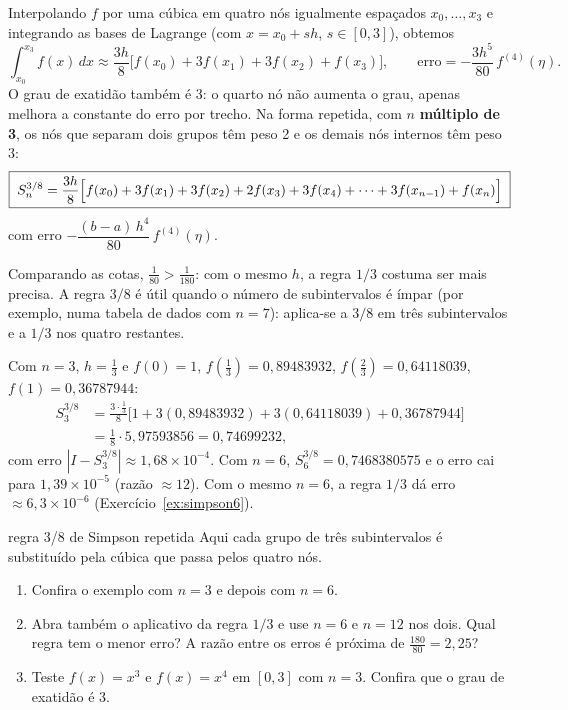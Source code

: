 Interpolando $f$ por uma cúbica em quatro nós igualmente espaçados $x_0,\dots,x_3$ e
integrando as bases de Lagrange (com $x=x_0+sh$, $s\in[0,3]$), obtemos
\[
\int_{x_0}^{x_3}f(x)\,dx\approx\frac{3h}{8}\bigl[f(x_0)+3f(x_1)+3f(x_2)+f(x_3)\bigr],
\qquad\text{erro}=-\frac{3h^5}{80}\,f^{(4)}(\eta).
\]
O grau de exatidão também é 3: o quarto nó não aumenta o grau, apenas melhora a constante
do erro por trecho. Na forma repetida, com $n$ \textbf{múltiplo de 3}, os nós que separam dois
grupos têm peso 2 e os demais nós internos têm peso 3:
\[
\boxed{\;S^{3/8}_n=\frac{3h}{8}\Bigl[f(x_0)+3f(x_1)+3f(x_2)+2f(x_3)+3f(x_4)+\dots+3f(x_{n-1})+f(x_n)\Bigr]\;}
\]
com erro $-\dfrac{(b-a)\,h^4}{80}\,f^{(4)}(\eta)$.

Comparando as cotas, $\frac{1}{80}>\frac{1}{180}$: com o mesmo $h$, a regra $1/3$ costuma ser mais
precisa. A regra $3/8$ é útil quando o número de subintervalos é ímpar (por exemplo, numa
tabela de dados com $n=7$): aplica-se a $3/8$ em três subintervalos e a $1/3$ nos quatro
restantes.

\begin{exemplo}
Com $n=3$, $h=\frac13$ e $f(0)=1$, $f(\frac13)=0{,}89483932$, $f(\frac23)=0{,}64118039$,
$f(1)=0{,}36787944$:
\begin{align*}
S^{3/8}_3&=\frac{3\cdot\frac13}{8}\bigl[1+3(0{,}89483932)+3(0{,}64118039)+0{,}36787944\bigr]\\
&=\frac18\cdot5{,}97593856=0{,}74699232,
\end{align*}
com erro $|I-S^{3/8}_3|\approx1{,}68\times10^{-4}$. Com $n=6$, $S^{3/8}_6=0{,}7468380575$
e o erro cai para $1{,}39\times10^{-5}$ (razão $\approx12$). Com o mesmo $n=6$, a regra $1/3$
dá erro $\approx 6{,}3\times10^{-6}$ (Exercício~\ref{ex:simpson6}).
\end{exemplo}

\begin{atividade}{regra 3/8 de Simpson repetida}{\arqSimpB}
Aqui cada grupo de três subintervalos é substituído pela cúbica que passa pelos quatro nós.
\begin{enumerate}[nosep]
  \item Confira o exemplo com $n=3$ e depois com $n=6$.
  \item Abra também o aplicativo da regra $1/3$ e use $n=6$ e $n=12$ nos dois. Qual regra
        tem o menor erro? A razão entre os erros é próxima de $\frac{180}{80}=2{,}25$?
  \item Teste $f(x)=x^3$ e $f(x)=x^4$ em $[0,3]$ com $n=3$. Confira que o grau de exatidão é 3.
\end{enumerate}
\end{atividade}

